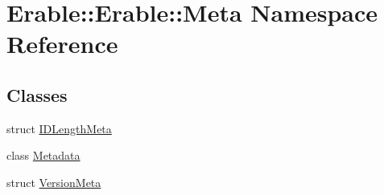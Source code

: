 \hypertarget{namespace_erable_1_1_erable_1_1_meta}{}\section{Erable\+::Erable\+::Meta Namespace Reference}
\label{namespace_erable_1_1_erable_1_1_meta}
\subsection*{Classes}
\begin{DoxyCompactItemize}
\item 
struct \mbox{\hyperlink{struct_erable_1_1_erable_1_1_meta_1_1_i_d_length_meta}{I\+D\+Length\+Meta}}
\item 
class \mbox{\hyperlink{class_erable_1_1_erable_1_1_meta_1_1_metadata}{Metadata}}
\item 
struct \mbox{\hyperlink{struct_erable_1_1_erable_1_1_meta_1_1_version_meta}{Version\+Meta}}
\end{DoxyCompactItemize}
